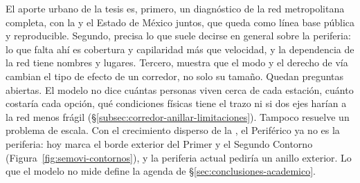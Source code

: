 El aporte urbano de la tesis es, primero, un diagnóstico de la red
metropolitana completa, con la \cdmx{} y el Estado de México juntos, que queda
como línea base pública y reproducible. Segundo, precisa lo que suele decirse
en general sobre la periferia: lo que falta ahí es cobertura y capilaridad más
que velocidad, y la dependencia de la red tiene nombres y lugares. Tercero,
muestra que el modo y el derecho de vía cambian el tipo de efecto de un
corredor, no solo su tamaño. Quedan preguntas abiertas. El modelo no dice
cuántas personas viven cerca de cada estación, cuánto costaría cada opción, qué
condiciones físicas tiene el trazo ni si dos ejes harían a la red menos frágil
(§\ref{subsec:corredor-anillar-limitaciones}). Tampoco resuelve un problema de
escala. Con el crecimiento disperso de la \zmvm{}, el Periférico ya no es la
periferia: hoy marca el borde exterior del Primer y el Segundo Contorno
(Figura~\ref{fig:semovi-contornos}), y la periferia actual pediría un anillo
exterior. Lo que el modelo no mide define la agenda de
§\ref{sec:conclusiones-academico}.
